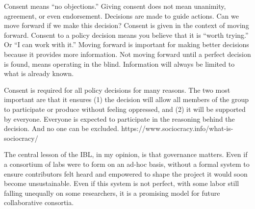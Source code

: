 \documentclass[11pt]{article}
\begin{document}
\begin{multicols}{2}
\begin{leftbar}
Consent means ``no objections.'' Giving consent does not mean unanimity,
agreement, or even endorsement. Decisions are made to guide actions. Can
we move forward if we make this decision? Consent is given in the
context of moving forward. Consent to a policy decision means you
believe that it is ``worth trying.'' Or ``I can work with it.'' Moving
forward is important for making better decisions because it provides
more information. Not moving forward until a perfect decision is found,
means operating in the blind. Information will always be limited to what
is already known.

Consent is required for all policy decisions for many reasons. The two
most important are that it ensures (1) the decision will allow all
members of the group to participate or produce without feeling
oppressed, and (2) it will be supported by everyone. Everyone is
expected to participate in the reasoning behind the decision. And no one
can be excluded. https://www.sociocracy.info/what-is-sociocracy/
\end{leftbar}

The central lesson of the IBL, in my opinion, is that governance
matters. Even if a consortium of labs were to form on an ad-hoc basis,
without a formal system to ensure contributors felt heard and empowered
to shape the project it would soon become unsustainable. Even if this
system is not perfect, with some labor still falling unequally on some
researchers, it is a promising model for future collaborative consortia.


\end{multicols}
\end{document}
